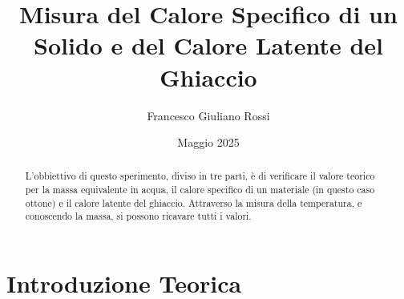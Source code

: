 \documentclass[a4paper]{article}
\title{Misura del Calore Specifico di un Solido e del Calore Latente del Ghiaccio}
\author{Francesco Giuliano Rossi}
\date{Maggio 2025}
\begin{document}
\maketitle
\tableofcontents

\begin{abstract}
    L'obbiettivo di questo sperimento, diviso in tre parti, è di verificare il valore teorico per la massa equivalente in acqua, il calore specifico di un materiale (in questo caso ottone) e il calore latente del ghiaccio. Attraverso la misura della temperatura, e conoscendo la massa, si possono ricavare tutti i valori. 
\end{abstract}

\section{Introduzione Teorica}
\end{document}
